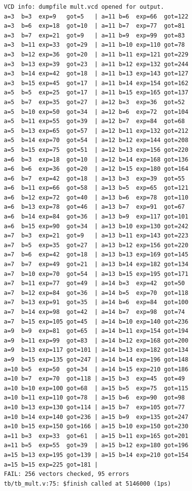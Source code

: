 \documentclass[conference,10pt]{IEEEtran}
\begin{document}
\begin{lstlisting}[title={\textbf{2. Part A Task 6 Error-Injection Log (\texttt{sum = a \^{} b} --- All 95 Mismatches)}},basicstyle=\ttfamily\tiny]
VCD info: dumpfile mult.vcd opened for output.
a=3  b=3  exp=9   got=5   | a=11 b=6  exp=66  got=122
a=3  b=6  exp=18  got=10  | a=11 b=7  exp=77  got=81
a=3  b=7  exp=21  got=9   | a=11 b=9  exp=99  got=83
a=3  b=11 exp=33  got=29  | a=11 b=10 exp=110 got=78
a=3  b=12 exp=36  got=20  | a=11 b=11 exp=121 got=229
a=3  b=13 exp=39  got=23  | a=11 b=12 exp=132 got=244
a=3  b=14 exp=42  got=18  | a=11 b=13 exp=143 got=127
a=3  b=15 exp=45  got=17  | a=11 b=14 exp=154 got=162
a=5  b=5  exp=25  got=17  | a=11 b=15 exp=165 got=137
a=5  b=7  exp=35  got=27  | a=12 b=3  exp=36  got=52
a=5  b=10 exp=50  got=34  | a=12 b=6  exp=72  got=104
a=5  b=11 exp=55  got=39  | a=12 b=7  exp=84  got=68
a=5  b=13 exp=65  got=57  | a=12 b=11 exp=132 got=212
a=5  b=14 exp=70  got=54  | a=12 b=12 exp=144 got=208
a=5  b=15 exp=75  got=51  | a=12 b=13 exp=156 got=220
a=6  b=3  exp=18  got=10  | a=12 b=14 exp=168 got=136
a=6  b=6  exp=36  got=20  | a=12 b=15 exp=180 got=164
a=6  b=7  exp=42  got=18  | a=13 b=3  exp=39  got=55
a=6  b=11 exp=66  got=58  | a=13 b=5  exp=65  got=121
a=6  b=12 exp=72  got=40  | a=13 b=6  exp=78  got=110
a=6  b=13 exp=78  got=46  | a=13 b=7  exp=91  got=67
a=6  b=14 exp=84  got=36  | a=13 b=9  exp=117 got=101
a=6  b=15 exp=90  got=34  | a=13 b=10 exp=130 got=242
a=7  b=3  exp=21  got=9   | a=13 b=11 exp=143 got=223
a=7  b=5  exp=35  got=27  | a=13 b=12 exp=156 got=220
a=7  b=6  exp=42  got=18  | a=13 b=13 exp=169 got=145
a=7  b=7  exp=49  got=21  | a=13 b=14 exp=182 got=134
a=7  b=10 exp=70  got=54  | a=13 b=15 exp=195 got=171
a=7  b=11 exp=77  got=49  | a=14 b=3  exp=42  got=50
a=7  b=12 exp=84  got=36  | a=14 b=5  exp=70  got=118
a=7  b=13 exp=91  got=35  | a=14 b=6  exp=84  got=100
a=7  b=14 exp=98  got=42  | a=14 b=7  exp=98  got=74
a=7  b=15 exp=105 got=45  | a=14 b=10 exp=140 got=236
a=9  b=9  exp=81  got=65  | a=14 b=11 exp=154 got=194
a=9  b=11 exp=99  got=83  | a=14 b=12 exp=168 got=200
a=9  b=13 exp=117 got=101 | a=14 b=13 exp=182 got=134
a=9  b=15 exp=135 got=247 | a=14 b=14 exp=196 got=148
a=10 b=5  exp=50  got=34  | a=14 b=15 exp=210 got=186
a=10 b=7  exp=70  got=118 | a=15 b=3  exp=45  got=49
a=10 b=10 exp=100 got=68  | a=15 b=5  exp=75  got=115
a=10 b=11 exp=110 got=78  | a=15 b=6  exp=90  got=98
a=10 b=13 exp=130 got=114 | a=15 b=7  exp=105 got=77
a=10 b=14 exp=140 got=236 | a=15 b=9  exp=135 got=247
a=10 b=15 exp=150 got=166 | a=15 b=10 exp=150 got=230
a=11 b=3  exp=33  got=61  | a=15 b=11 exp=165 got=201
a=11 b=5  exp=55  got=39  | a=15 b=12 exp=180 got=196
a=15 b=13 exp=195 got=139 | a=15 b=14 exp=210 got=154
a=15 b=15 exp=225 got=181 |
FAIL: 256 vectors checked, 95 errors
tb/tb_mult.v:75: $finish called at 5146000 (1ps)
\end{lstlisting}
\end{document}
